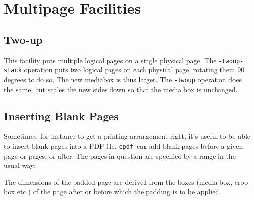 \documentclass{book}
\newcommand{\cpdf}{\texttt{cpdf}}
\begin{document}
\chapter{Multipage Facilities}\pagestyle{fancy}
\noindent{}
  \section{Two-up}
    This facility puts multiple logical pages on a single physical page.  The \texttt{-twoup-stack} operation puts two logical pages on each physical
page, rotating them 90 degrees to do so. The new mediabox is thus larger. The \texttt{-twoup} operation does the same, but scales the new sides down so
that the media box is unchanged.


  \section{Inserting Blank Pages}
  Sometimes, for instance to get a printing arrangement right, it's useful to
be able to insert blank pages into a PDF file. \cpdf\ can add blank pages
before a given page or pages, or after. The pages in question are specified by
a range in the usual way:

\noindent{}
  \noindent The dimensions of the padded page are derived from the boxes (media box, crop box etc.) of the page after or before which the padding is to be applied.
\end{document}
